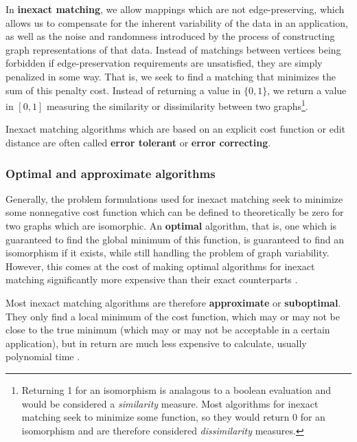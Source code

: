 \documentclass[12pt]{thesis}
\theoremstyle{plain}
\theoremstyle{definition}
\theoremstyle{remark}
\begin{document}
In \textbf{inexact matching}, we allow mappings which are not edge-preserving, which allows us to compensate for the inherent variability of the data in an application, as well as the noise and randomness introduced by the process of constructing graph representations of that data. Instead of matchings between vertices being forbidden if edge-preservation requirements are unsatisfied, they are simply penalized in some way. That is, we seek to find a matching that minimizes the sum of this penalty cost. Instead of returning a value in $\{0,1\}$, we return a value in $[0,1]$ measuring the similarity or dissimilarity between two graphs\footnote{Returning 1 for an isomorphism is analagous to a boolean evaluation and would be considered a \textit{similarity} measure. Most algorithms for inexact matching seek to minimize some function, so they would return 0 for an isomorphism and are therefore considered \textit{dissimilarity} measures.}.

Inexact matching algorithms which are based on an explicit cost function or edit distance are often called \textbf{error tolerant} or \textbf{error correcting}. 

\subsubsection{Optimal and approximate algorithms}

Generally, the problem formulations used for inexact matching seek to minimize some nonnegative cost function which can be defined to theoretically be zero for two graphs which are isomorphic. An \textbf{optimal} algorithm, that is, one which is guaranteed to find the global minimum of this function, is guaranteed to find an isomorphism if it exists, while still handling the problem of graph variability. However, this comes at the cost of making optimal algorithms for inexact matching significantly more expensive than their exact counterparts \cite{Conte_2004}.

Most inexact matching algorithms are therefore \textbf{approximate} or \textbf{suboptimal}. They only find a local minimum of the cost function, which may or may not be close to the true minimum (which may or may not be acceptable in a certain application), but in return are much less expensive to calculate, usually polynomial time  \cite{Conte_2004}.
\end{document}
